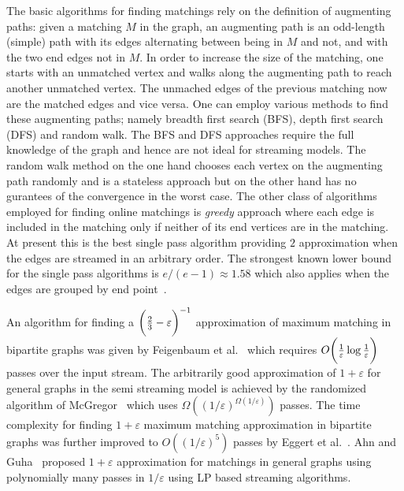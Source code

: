 \documentclass{scrartcl}
\begin{document}
The basic algorithms for finding matchings rely on the definition of augmenting paths:
given a matching $M$ in the graph, an augmenting path is an odd-length
(simple) path with its edges alternating between being in $M$
and not, and with the two end edges not in $M$. In order to increase the size of the matching, one starts with an unmatched vertex and walks along the augmenting path to reach another unmatched vertex. The unmached edges of the previous matching now are the matched edges and vice versa.
One can employ various methods to find these augmenting paths; namely breadth first search (BFS), depth first search (DFS) and random walk. The BFS and DFS approaches require the full knowledge of the graph and hence are not ideal for streaming models. The random walk method on the one hand chooses each vertex on the augmenting path randomly and is a stateless approach but on the other hand has no gurantees of the convergence in the worst case.
The other class of algorithms employed for finding online matchings is \emph{greedy} approach where each edge is included in the matching only if neither of its end vertices are in the matching. At present this is the best single pass algorithm providing $2$ approximation when the edges are streamed in an arbitrary order. The strongest known lower bound for the single pass algorithms is $e/(e-1)\approx 1.58$ which also applies when the edges are grouped by end point~\cite{boundsKap,Goel}.

An algorithm for finding a $\bigg( {2\over3}-\varepsilon \bigg)^{-1}$ approximation of maximum matching in bipartite graphs was given by Feigenbaum et al.~\cite{Feigenbaum05} which requires $O\bigg( {1\over \varepsilon}\log {1\over \varepsilon}\bigg)$ passes over the input stream. The arbitrarily good approximation of $1+\varepsilon$ for general graphs in the semi streaming model is achieved by the randomized algorithm of McGregor~\cite{McGregor05} which uses $\Omega((1/\varepsilon)^{\Omega(1/\varepsilon)})$ passes. The time complexity for finding $1+\varepsilon$ maximum matching approximation in bipartite graphs was further improved to $O((1/\varepsilon)^5)$ passes by Eggert et al.~\cite{EKMS11}. Ahn and Guha~\cite{AG11} proposed $1+\varepsilon$ approximation for matchings in general graphs using polynomially many passes in $1/\varepsilon$ using LP based streaming algorithms.
\end{document}
